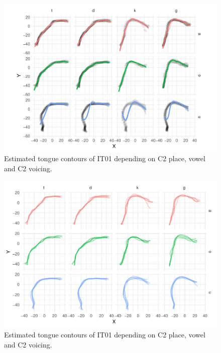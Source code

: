 \documentclass[11pt,]{article}
\begin{document}
\begin{figure}

{\centering \includegraphics[width=\linewidth]{2018-polar-gam_files/figure-latex/Figure01} 

}

\caption{Estimated tongue contours of IT01 depending on C2 place, vowel and C2 voicing.}\label{f:Figure01}
\end{figure}

\begin{figure}

{\centering \includegraphics[width=\linewidth]{2018-polar-gam_files/figure-latex/Figure02} 

}

\caption{Estimated tongue contours of IT01 depending on C2 place, vowel and C2 voicing.}\label{f:Figure02}
\end{figure}
\end{document}
